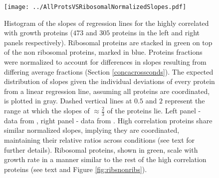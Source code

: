\documentclass{article}
\newcommand{\hGlobal}{$473$}
\newcommand{\vnGlobal}{$305$}
\newcommand{\vGlobal}{\vnGlobal{}}
\begin{document}
\begin{figure}[H]
\begin{center}
\texttt{[image: ../AllProtsVSRibosomalNormalizedSlopes.pdf]}
\caption{\label{fig:globalfit}
    Histogram of the slopes of regression lines for the highly correlated with growth proteins (\hGlobal{} and \vGlobal{} proteins in the left and right panels respectively).
    Ribosomal proteins are stacked in green on top of the non ribosomal proteins, marked in blue.
    Proteins fractions were normalized to account for differences in slopes resulting from differing average fractions (Section \ref{concacrossconds}).
    The expected distribution of slopes given the individual deviations of every protein from a linear regression line, assuming all proteins are coordinated, is plotted in gray.
    Dashed vertical lines at $0.5$ and $2$ represent the range at which the slopes of $\approx \frac{2}{3}$ of the proteins lie.
    Left panel - data from \cite{Heinemann2015}, right panel - data from \cite{Peebo_2015}.
    High correlation proteins share similar normalized slopes, implying they are coordinated, maintaining their relative ratios across conditions (see text for further details).
    Ribosomal proteins, shown in green, scale with growth rate in a manner similar to the rest of the high correlation proteins (see text and Figure \ref{fig:ribsnonribs}).
%
}
\end{center}
\end{figure}
\end{document}

